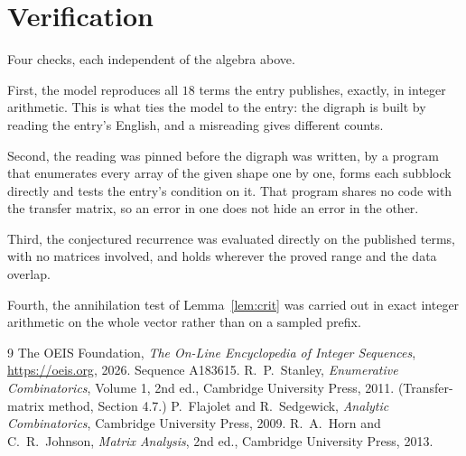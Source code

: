 \documentclass[11pt,a4paper]{article}
\theoremstyle{plain}
\theoremstyle{definition}
\begin{document}
\section{Verification}

Four checks, each independent of the algebra above.

First, the model reproduces all $18$ terms the entry publishes, exactly, in integer
arithmetic. This is what ties the model to the entry: the digraph is built by reading the
entry's English, and a misreading gives different counts.

Second, the reading was pinned before the digraph was written, by a program that enumerates
every array of the given shape one by one, forms each subblock directly and tests the entry's
condition on it. That program shares no code with the transfer matrix, so an error in one does
not hide an error in the other.

Third, the conjectured recurrence was evaluated directly on the published terms, with no
matrices involved, and holds wherever the proved range and the data overlap.

Fourth, the annihilation test of Lemma~\ref{lem:crit} was carried out in exact integer
arithmetic on the whole vector rather than on a sampled prefix.

\begin{thebibliography}{9}
 The OEIS Foundation, \emph{The On-Line Encyclopedia of Integer
Sequences}, \url{https://oeis.org}, 2026. Sequence A183615.
 R.~P.~Stanley, \emph{Enumerative Combinatorics}, Volume 1, 2nd ed.,
Cambridge University Press, 2011. (Transfer-matrix method, Section 4.7.)
 P.~Flajolet and R.~Sedgewick, \emph{Analytic Combinatorics}, Cambridge
University Press, 2009.
 R.~A.~Horn and C.~R.~Johnson, \emph{Matrix Analysis}, 2nd ed., Cambridge
University Press, 2013.
\end{thebibliography}
\end{document}
